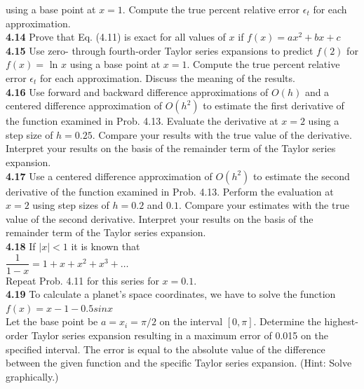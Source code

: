 \documentclass[../main.tex]{subfiles}
\begin{document}
\begin{multicols}{2}
    \noindent using a base point at $x = 1$. Compute the true percent relative
    error $\epsilon_t$ for each approximation.\\

    \noindent\textbf{4.14} Prove that Eq. (4.11) is exact for all values of $x$ 
    if $f(x) = ax^2+bx+c$\\

    \noindent\textbf{4.15} Use zero- through fourth-order Taylor series expansions
    to predict $f(2)$ for $f (x) =$ ln $x$ using a base point at $ x = 1$.
    Compute the true percent relative error $\epsilon_t$ for each approximation.
    Discuss the meaning of the results.\\

    \noindent\textbf{4.16} Use forward and backward difference approximations
    of $O(h)$ and a centered difference approximation of $O(h^2)$ to
    estimate the first derivative of the function examined in
    Prob. 4.13. Evaluate the derivative at $x = 2$ using a step size
    of $h = 0.25$. Compare your results with the true value of the
    derivative. Interpret your results on the basis of the remainder
    term of the Taylor series expansion.\\

    \noindent\textbf{4.17} Use a centered difference approximation of $O(h^2)$ to
    estimate the second derivative of the function examined in
    Prob. 4.13. Perform the evaluation at $x = 2$ using step sizes
    of $h = 0.2$ and $0.1$. Compare your estimates with the true
    value of the second derivative. Interpret your results on the
    basis of the remainder term of the Taylor series expansion.\\

    \noindent\textbf{4.18} If $\left\lvert x \right\rvert < 1$ it is known that\\

    $\dfrac{1}{1-x} = 1+x+x^2+x^3+\hdots$\\

    \noindent Repeat Prob. 4.11 for this series for $x = 0.1$.\\

    \noindent\textbf{4.19} To calculate a planet's space coordinates, we have to
    solve the function\\

    $f(x)=x-1-0.5sinx$\\

    \noindent Let the base point be $a = x_i = \pi/2$ on the interval $[0, \pi]$.
    Determine the highest-order Taylor series expansion resulting
    in a maximum error of 0.015 on the specified interval.
    The error is equal to the absolute value of the difference
    between the given function and the specific Taylor series
    expansion. (Hint: Solve graphically.)\\


\end{multicols}
\end{document}
